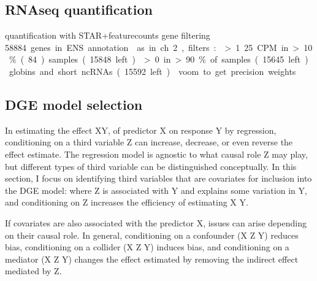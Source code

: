 \begin{outline}
\subsection{RNAseq quantification}

\1 quantification with STAR+featurecounts
\1 gene filtering
    \1 \SI{58884} genes in ENS annotation
    \1 as in ch 2, filters:
        \2 >1.25 CPM in >10\% (84) samples (15848 left)
        \2 >0 in >90\% of samples (15645 left)
        \2 globins and short ncRNAs (15592 left)
\1 voom to get precision weights

\subsection{DGE model selection}

\1 In estimating the effect X\textrightarrow Y, of predictor X on response Y by regression, 
conditioning on a third variable Z can increase, decrease, or even reverse the effect estimate.
The regression model is agnostic to what causal role Z may play,
but different types of third variable can be distinguished conceptually.
In this section, I focus on identifying third variables that are covariates for inclusion into the \gls{DGE} model:
where Z is associated with Y and explains some variation in Y,
and conditioning on Z increases the efficiency of estimating X \textrightarrow Y.

\1 If covariates are also associated with the predictor X, issues can arise depending on their causal role.
In general,
conditioning on a confounder (X \textleftarrow Z \textrightarrow Y) reduces bias,
conditioning on a collider (X \textrightarrow Z \textleftarrow Y) induces bias,
and conditioning on a mediator (X \textrightarrow Z \textrightarrow Y) changes the effect estimated by removing the indirect effect mediated by Z.


\end{outline}
